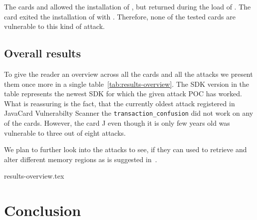 \documentclass{../llncs/llncs}
\begin{document}
            The cards \Acard and \Dcard allowed the installation of \vulnscap, but returned \shortswwrongdata during the load of \appletscap. The card \Icard exited the installation of \appletscap with \shortswconditionsnotsatisfied.
            Therefore, none of the tested cards are vulnerable to this kind of attack.

            \subsection{Overall results}

        To give the reader an overview across all the cards and all the attacks we present them once more in a single table~\ref{tab:results-overview}. The SDK version in the table represents the newest SDK for which the given attack POC has worked. What is reassuring is the fact, that the currently oldest attack registered in JavaCard Vulnerabilty Scanner the \texttt{transaction_confusion} did not work on any of the cards. However, the card J even though it is only few years old was vulnerable to three out of eight attacks.
    
        We plan to further look into the attacks to see, if they can used to retrieve and alter different memory regions as is suggested in~\cite{se:oracle:part1}.

\setlength{\tabcolsep}{2pt}
\renewcommand{\arraystretch}{1.2}

    {results-overview.tex}

\setlength{\tabcolsep}{\oldtabcolsep}
\renewcommand{\arraystretch}{1.2}
\setlength{\floatsep}{\oldtabcolsep}


\section{Conclusion}


\end{document}
